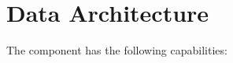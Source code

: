 \chapter{Data Architecture}\label{ch:ekg-mm-b-2} %

The  component has the following capabilities:

\begin{itemize}[leftmargin=.5in]
\end{itemize}




